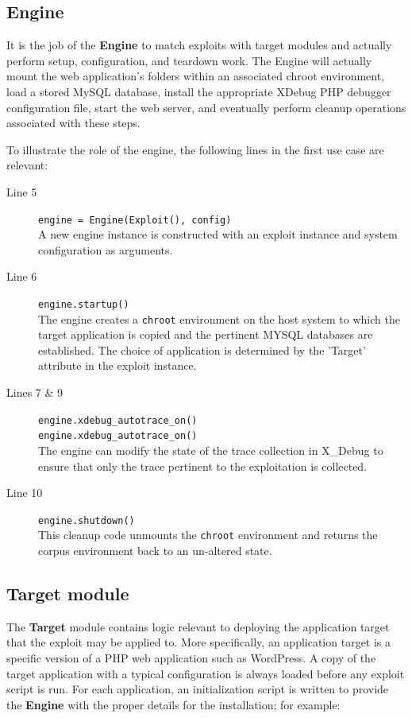 \documentclass[letterpaper,twocolumn,10pt]{article}
\begin{document}
\subsection{Engine}
It is the job of the {\bf Engine} to match exploits with target modules and actually perform setup, configuration, and teardown work. The Engine will actually mount the web application's folders within an associated chroot environment, load a stored MySQL database, install the appropriate XDebug PHP debugger configuration file, start the web server, and eventually perform cleanup operations associated with these steps. 

To illustrate the role of the engine, the following lines in the first use case are relevant:
\begin{description}
  \item[Line 5] {\tt \footnotesize    engine = Engine(Exploit(), config)} \\ A new engine instance is constructed with an exploit instance and system configuration as arguments.
  \item[Line 6] {\tt \footnotesize     engine.startup()} \\The engine creates a {\tt chroot} environment on the host system to which the target application is copied and the pertinent MYSQL databases are established. The choice of application is determined by the 'Target' attribute in the exploit instance. 
  \item[Lines 7 \& 9] {\tt \footnotesize engine.xdebug\_autotrace\_on()\\ engine.xdebug\_autotrace\_on()}\\The engine can modify the state of the trace collection in X\_Debug to ensure that only the trace pertinent to the exploitation is collected.
  \item[Line 10] {\tt \footnotesize engine.shutdown()}\\This cleanup code unmounts the {\tt chroot} environment and returns the corpus environment back to an un-altered state.
\end{description}





\subsection{Target module}
The {\bf Target} module contains logic relevant to deploying the application target that the exploit may be applied to.  More specifically, an application target is a specific version of a PHP web application such as WordPress. A copy of the target application with a typical configuration is always loaded before any exploit script is run.  For each application, an initialization script is written to provide the {\bf Engine} with the proper details for the installation; for example:
\end{document}
